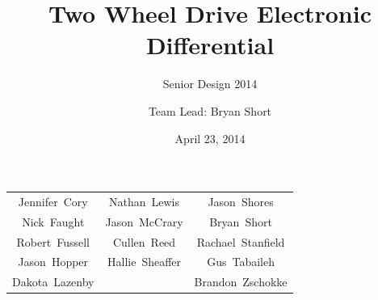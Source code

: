 \documentclass{beamer}
\title[Two Wheel Drive Electronic Differential]{
  Two Wheel Drive Electronic Differential}
\subtitle{Senior Design 2014}
\author[Senior Design Team 2014]{
  Team Lead: Bryan Short}
\institute[NC State Engineering Programs at UNC-Asheville]{
  NC State Engineering Programs at UNC-Asheville}
\date[April 23, 2014]{
  April 23, 2014}
\begin{document}
\begin{frame}[plain]
  \titlepage
  \centering
\begin{tabular}{c c c} 
\small{Jennifer~Cory}    &    \small{ Nathan~Lewis}        &  \small{Jason~Shores}        \\
\small{Nick~Faught }        &  \small{  Jason~McCrary}     &  \small{ Bryan~Short  }          \\ 
\small{Robert~Fussell}    &   \small{ Cullen~Reed   }      &   \small{Rachael~Stanfield}  \\
\small{Jason~Hopper  }   &   \small{Hallie~Sheaffer }    &  \small{ Gus~Tabaileh   }       \\
\small{Dakota~Lazenby} &                                                  &  \small{ Brandon~Zschokke} \\
\end{tabular} 
\end{frame}



\end{document}
